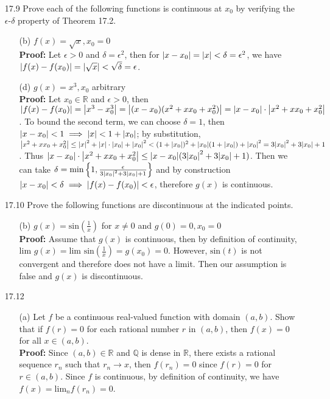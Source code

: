 \documentclass{article}
\begin{document}
\begin{itemize}
    \item [17.9] Prove each of the following functions is continuous at $x_0$ by verifying the $\epsilon$-$\delta$ property of Theorem 17.2.
          \begin{itemize}
              \item [(b)] $f(x)=\sqrt{x},x_0=0$\\\textbf{Proof: } Let $\epsilon>0$ and $\delta=\epsilon^2$, then for $\abs{x-x_0}=\abs{x}<\delta=\epsilon^2$, we have $\abs{f(x)-f(x_0)}=\abs{\sqrt{x}}<\sqrt{\delta}=\epsilon$.
              \item [(d)] $g(x)=x^3,x_0$ arbitrary\\\textbf{Proof: } Let $x_0\in\mathbb{R}$ and $\epsilon>0$, then $\abs{f(x)-f(x_0)}=\abs{x^3-x_0^3}=\abs{(x-x_0)(x^2+xx_0+x_0^2)}=\abs{x-x_0}\cdot\abs{x^2+xx_0+x_0^2}$. To bound the second term, we can choose $\delta=1$, then $\abs{x-x_0}<1\implies\abs{x}<1+\abs{x_0}$; by substitution, $\abs{x^2+xx_0+x_0^2}\leq\abs{x}^2+\abs{x}\cdot\abs{x_0}+\abs{x_0}^2<(1+\abs{x_0})^2+\abs{x_0}(1+\abs{x_0})+\abs{x_0}^2=3\abs{x_0}^2+3\abs{x_0}+1$. Thus $\abs{x-x_0}\cdot\abs{x^2+xx_0+x_0^2}\leq\abs{x-x_0}(3\abs{x_0}^2+3\abs{x_0}+1)$. Then we can take $\delta=\text{min}\left\{1,\frac{\epsilon}{3\abs{x_0}^2+3\abs{x_0}+1}\right\}$ and by construction $\abs{x-x_0}<\delta\implies\abs{f(x)-f(x_0)}<\epsilon$, therefore $g(x)$ is continuous.
          \end{itemize}
    \item [17.10] Prove the following functions are discontinuous at the indicated points.
          \begin{itemize}
              \item [(b)] $g(x)=\text{sin}(\frac{1}{x})$ for $x\neq 0$ and $g(0)=0,x_0=0$\\\textbf{Proof: } Assume that $g(x)$ is continuous, then by definition of continuity, $\text{lim }g(x)=\text{lim }\text{sin}(\frac{1}{x})=g(x_0)=0$. However, $\text{sin}(t)$ is not convergent and therefore does not have a limit. Then our assumption is false and $g(x)$ is discontinuous.
          \end{itemize}
    \item [17.12]
          \begin{itemize}
              \item [(a)] Let $f$ be a continuous real-valued function with domain $(a,b)$. Show that if $f(r)=0$ for each rational number $r$ in $(a,b)$, then $f(x)=0$ for all $x\in(a,b)$.\\\textbf{Proof: } Since $(a,b)\in\mathbb{R}$ and $\mathbb{Q}$ is dense in $\mathbb{R}$, there exists a rational sequence $r_n$ such that $r_n\rightarrow x$, then $f(r_n)=0$ since $f(r)=0$ for $r\in(a,b)$. Since $f$ is continuous, by definition of continuity, we have $f(x)=\text{lim}_nf(r_n)=0$.

\end{itemize}
\end{itemize}
\end{document}
